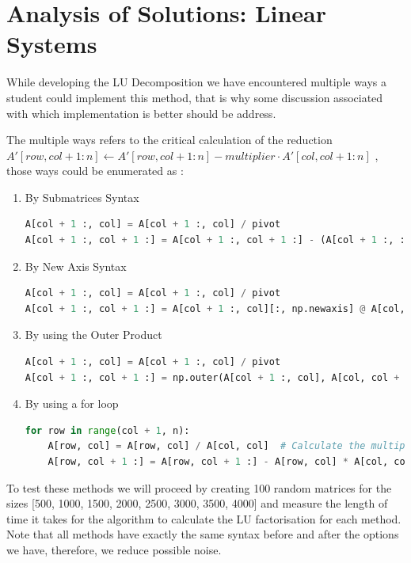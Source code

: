 \section{Analysis of Solutions: Linear Systems}
While developing the LU Decomposition we have encountered multiple ways a student could implement this method, that is why some discussion associated with which implementation is better should be address.

The multiple ways refers to the critical calculation of the reduction $ A'[row, col+1:n] \gets A'[row, col+1:n] - multiplier \cdot A'[col, col+1:n] $ , those ways could be enumerated as :

\begin{enumerate}
    \item By Submatrices Syntax
    \begin{lstlisting}[language=Python]
A[col + 1 :, col] = A[col + 1 :, col] / pivot
A[col + 1 :, col + 1 :] = A[col + 1 :, col + 1 :] - (A[col + 1 :, :][:, [col]] @ A[[col], :][:, col + 1 :])
    \end{lstlisting}

    \item By New Axis Syntax
    \begin{lstlisting}[language=Python]
A[col + 1 :, col] = A[col + 1 :, col] / pivot
A[col + 1 :, col + 1 :] = A[col + 1 :, col][:, np.newaxis] @ A[col, col + 1 :][np.newaxis, :]
    \end{lstlisting}

    \item By using the Outer Product
    \begin{lstlisting}[language=Python]
A[col + 1 :, col] = A[col + 1 :, col] / pivot
A[col + 1 :, col + 1 :] = np.outer(A[col + 1 :, col], A[col, col + 1 :])
    \end{lstlisting}

    \item By using a for loop
    \begin{lstlisting}[language=Python]
for row in range(col + 1, n):
    A[row, col] = A[row, col] / A[col, col]  # Calculate the multiplier and store in A for later use
    A[row, col + 1 :] = A[row, col + 1 :] - A[row, col] * A[col, col + 1 :]  # Update the remaining elements in the row using the multiplier
    \end{lstlisting} 
\end{enumerate}

To test these methods we will proceed by creating 100 random matrices for the sizes [500, 1000, 1500, 2000, 2500, 3000, 3500, 4000] and measure the length of time it takes for the algorithm to calculate the LU factorisation for each method. Note that all methods have exactly the same syntax before and after the options we have, therefore, we reduce possible noise.
